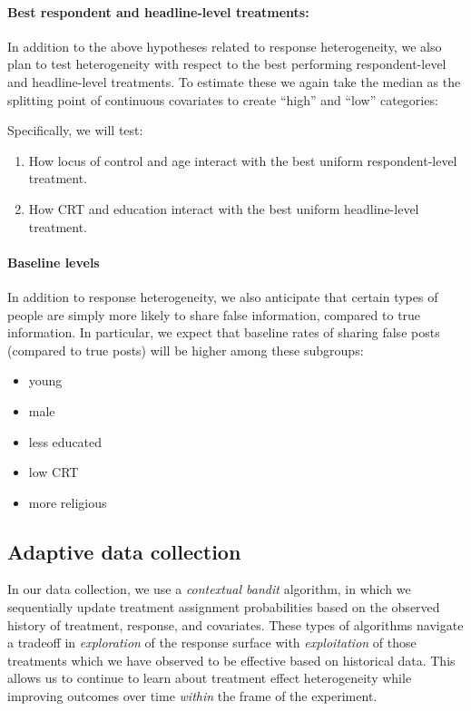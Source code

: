 \documentclass[letterpaper, 12pt, parskip=full,DIV=10]{scrartcl}
\begin{document}
\paragraph{Best respondent and headline-level treatments:} In addition to the above hypotheses related to response heterogeneity, we also plan to test heterogeneity with respect to the best performing respondent-level and headline-level treatments. To estimate these we again take the median as the splitting point of continuous covariates to create ``high'' and ``low'' categories: 

Specifically, we will test:
\begin{enumerate}
\item How locus of control and age interact with the best uniform respondent-level treatment. 
\item How CRT and education interact with the best uniform headline-level treatment. 
\end{enumerate}


\paragraph{Baseline levels}\label{baseline_levels}
In addition to response heterogeneity, we also anticipate that certain types of people are simply more likely to share false information, compared to true information. In particular, we expect that baseline rates of sharing false posts (compared to true posts) will be higher among these subgroups:
\begin{itemize}
\item young
\item male
\item less educated
\item low CRT
\item more religious
\end{itemize}


\subsection{Adaptive data collection}\label{adaptiveagent}

In our data collection, we use a \textit{contextual bandit} algorithm, in which we sequentially update treatment assignment probabilities based on the observed history of treatment, response, and covariates. These types of algorithms navigate a tradeoff in \textit{exploration} of the response surface with \textit{exploitation} of those treatments which we have observed to be effective based on historical data. This allows us to continue to learn about treatment effect heterogeneity while improving outcomes over time \textit{within} the frame of the experiment. 
\end{document}
